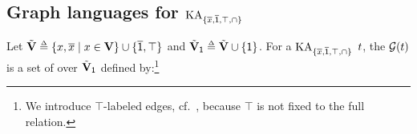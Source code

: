 \subsection{Graph languages for $\mathrm{KA}_{\{\overline{x}, \overline{\mathsf{1}}, \top, \cap\}}$}\label{section: languages basics}
Let $\tilde{\vsig} \defeq \set{x, \com{x} \mid x \in \vsig} \cup \set{\com{\id}, \top}$ and $\tilde{\vsig}_{\id} \defeq \tilde{\vsig} \cup \set{\id}$.
For a $\mathrm{KA}_{\{\overline{x}, \overline{\mathsf{1}}, \top, \cap\}}$  $\term$, the  $\glang(\term)$ \cite{andrekaEquationalTheoryUnionfree1995,brunetPetriAutomata2017,nakamuraExistentialCalculiRelations2023} is a set of  over $\tilde{\mathbf{V}}_{\mathsf{1}}$ defined by:\footnote{We introduce $\top$-labeled edges, cf.\ \cite[Def.\ 6]{nakamuraExistentialCalculiRelations2023}, because $\top$ is not fixed to the full relation.
}
